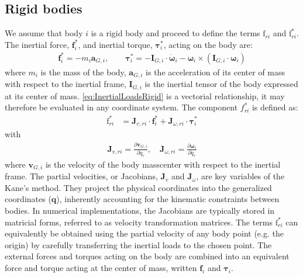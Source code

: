 \documentclass[wes, manuscript]{copernicus}
\renewcommand{\v}[1]{\boldsymbol{#1}}
\newcommand{\m}[1]{\boldsymbol{#1}}
\newcommand{\kanef}{\mathrm{f}}
\begin{document}
\subsection{Rigid bodies}
\label{sec:rigidbodies}
We assume that body $i$ is a rigid body and proceed to define the terms $\kanef_{ri}$ and $\kanef_{ri}^*$.
The inertial force, $\v{f}_i^*$, and inertial torque, $\v{\tau}_i^*$, acting on the body are:
\begin{align}
     \v{f}_i^* = - m_i \v{a}_{G,i},
         \qquad
     \v{\tau}_i^* = -\m{I}_{G,i} \cdot \v{\dot{\omega}}_i - \v{\omega} _i \times( \m{I}_{G,i}\cdot \v{\omega}_i)
      \label{eq:InertialLoadsRigid}
\end{align}
where $m_i$ is the mass of the body, $\v{a}_{G,i}$ is the acceleration of its center of mass with respect to the inertial frame, $\m{I}_{G,i}$ is the inertial tensor of the body expressed at its center of mass. 
\autoref{eq:InertialLoadsRigid} is a vectorial relationship, it may therefore be evaluated in any coordinate system. 
The component $f_{ri}^*$ is defined as:
\begin{align}
   \kanef_{ri}^* &= \v{J}_{v,ri} \cdot \v{f}_i^*  + \v{J}_{\omega,ri} \cdot \v{\tau}_i^*
    \label{eq:frstarRigid}
\end{align}
with
\begin{align}
    \v{J}_{v,ri} = \frac{\partial \v{v}_{G,i}}{\partial \dot{q}_r}
    ,\quad
    \v{J}_{\omega,ri} = \frac{\partial \v{\omega}_{i}}{\partial \dot{q}_r}
\end{align}
where $\v{v}_{G,i}$ is the velocity of the body masscenter with respect to the inertial frame.
The partial velocities, or Jacobians, $\v{J}_v$ and $\v{J}_\omega$, are key variables of the Kane's method.
They project the physical coordinates into the generalized coordinates ($\v{q}$), inherently accounting for the kinematic constraints between bodies.
In numerical implementations, the Jacobians are typically stored in matricial forms, referred to as velocity transformation matrices.
The terms $\kanef_{ri}^*$ can equivalently be obtained using the partial velocity of any body point (e.g. the origin) by carefully transferring the inertial loads to the chosen point.
The external forces and torques acting on the body are combined into an equivalent force and torque acting at the center of mass, written $\v{f}_i$  and $\v{\tau}_i$. 
\end{document}
